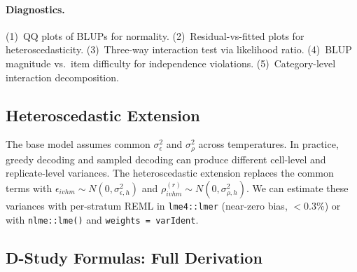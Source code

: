 \paragraph{Diagnostics.} (1)~QQ plots of BLUPs \citep[best linear unbiased predictions;][]{robinson1991blup} for normality. (2)~Residual-vs-fitted plots for heteroscedasticity. (3)~Three-way interaction test via likelihood ratio. (4)~BLUP magnitude vs.\ item difficulty for independence violations. (5)~Category-level interaction decomposition.

\subsection{Heteroscedastic Extension}
\label{si:heteroscedastic}

The base model assumes common $\sigma^2_\epsilon$ and $\sigma^2_\rho$ across temperatures. In practice, greedy decoding and sampled decoding can produce different cell-level and replicate-level variances. The heteroscedastic extension replaces the common terms with $\epsilon_{ivhm} \sim N(0, \sigma^2_{\epsilon,h})$ and $\rho_{ivhm}^{(r)} \sim N(0, \sigma^2_{\rho,h})$. We can estimate these variances with per-stratum REML in \texttt{lme4::lmer} (near-zero bias, $<$0.3\%) or with \texttt{nlme::lme()} \citep{pinheirobates2000} and \texttt{weights = varIdent}.

\subsection{D-Study Formulas: Full Derivation}

